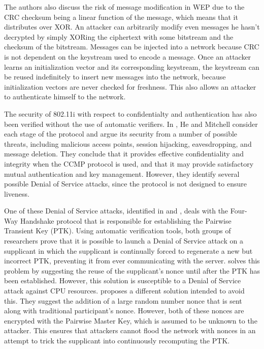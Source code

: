 \documentclass[11pt, twocolumn]{article} %
\begin{document}
The authors also discuss the risk of message modification in WEP due to the CRC checksum being a linear function of the message, which means that it distributes over XOR.  An attacker can arbitrarily modify even messages he hasn't decrypted by simply XORing the ciphertext with some bitstream and the checksum of the bitstream.  Messages can be injected into a network because CRC is not dependent on the keystream used to encode a message. Once an attacker learns an initialization vector and its corresponding keystream, the keystream can be reused indefinitely to insert new messages into the network, because initialization vectors are never checked for freshness.  This also allows an attacker to authenticate himself to the network.  

The security of 802.11i with respect to confidentialty and authentication has also been verified without the use of automatic verifiers.  In \cite{he05}, He and Mitchell consider each stage of the protocol and argue its security from a number of possible threats, including malicious access points, session hijacking, eavesdropping, and message deletion.  They conclude that it provides effective confidentiality and integrity when the CCMP protocol is used, and that it may provide satisfactory mutual authentication and key management.  However, they identify several possible Denial of Service attacks, since the protocol is not designed to ensure liveness.

One of these Denial of Service attacks, identified in \cite{he04} and \cite{liu08}, deals with the Four-Way Handshake protocol that is responsible for establishing the Pairwise Transient Key (PTK).  Using automatic verification tools, both groups of researchers prove that it is possible to launch a Denial of Service attack on a supplicant in which the supplicant is continually forced to regenerate a new but incorrect PTK, preventing it from ever communicating with the server.  \cite{he04} solves this problem by suggesting the reuse of the supplicant's nonce until after the PTK has been established.  However, this solution is susceptible to a Denial of Service attack against CPU resources.  \cite{liu08} proposes a different solution intended to avoid this.  They suggest the addition of a large random number nonce that is sent along with traditional participant's nonce.  However, both of these nonces are encrypted with the Pairwise Master Key, which is assumed to be unknown to the attacker.  This ensures that attackers cannot flood the network with nonces in an attempt to trick the supplicant into continuously recomputing the PTK.
\end{document}
